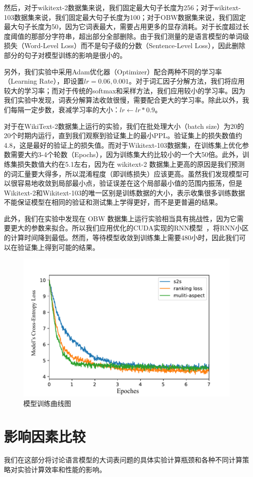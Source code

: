 然后，对于wikitext-2数据集来说，我们固定最大句子长度为256；对于wikitext-103数据集来说，我们固定最大句子长度为100；对于OBW数据集来说，我们固定最大句子长度为50，因为它词表最大，需要占用更多的显存消耗。对于长度超过长度阈值的那部分字符串，超出部分全部删除。由于我们测量的是语言模型的单词级损失（Word-Level Loss）而不是句子级的分数（Sentence-Level Loss），因此删除部分的句子对模型训练的影响是很小的。

另外，我们实验中采用Adam优化器（Optimizer）配合两种不同的学习率（Learning Rate），即设置$ lr = 0.06,0.001 $。对于词汇因子分解方法，我们将应用较大的学习率；而对于传统的softmax和采样方法，我们应用较小的学习率。因为我们实验中发现，词表分解算法收敛很慢，需要配合更大的学习率。除此以外，我们每隔一定步数，衰减学习率的大小：$lr \leftarrow lr *0.9$。

对于在WikiText-2数据集上运行的实验，我们在批处理大小（batch size）为20的20个时期内运行，直到我们观察到验证集上的最小$ \mathrm{PPL} $。验证集上的损失数值约4.8，这是最好的验证上的损失值。而对于Wikitext-103数据集，在训练集上优化参数需要大约3-4个轮数（Epochs），因为训练集大约比较小的一个大50倍。此外，训练集损失数值大约在5.1左右，因为在 wikitext-2 数据集上更高的原因是我们预测的词汇量要大得多，所以混淆程度（即训练损失）应该更高。虽然我们发现模型可以很容易地收敛到局部最小点，验证误差在这个局部最小值的范围内振荡，但是Wikitext-2和Wikitext-103的唯一区别是训练数据的大小，表示收集很多训练数据不能保证模型在相同的验证和测试集上学得更好，而不是更普遍的结果。

此外，我们在实验中发现在 OBW 数据集上运行实验相当具有挑战性，因为它需要更大的参数来拟合。所以我们应用优化的CUDA实现的RNN模型~，将RNN小区的计算时间降到最低。然而，等待模型收敛到训练集上需要480小时，因此我们可以在验证集上得到可能的结果。
\begin{figure}[!ht]
  \centering
  \includegraphics[width=0.6\columnwidth]{./figures/learn2.pdf}
  \caption{模型训练曲线图}
\end{figure}

\section{影响因素比较}
我们在这部分将讨论语言模型的大词表问题的具体实验计算瓶颈和各种不同计算策略对实验计算效率和性能的影响。

